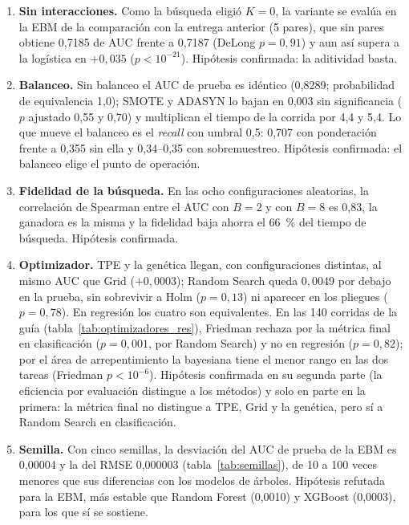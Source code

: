 \begin{enumerate}
  \item \textbf{Sin interacciones.} Como la búsqueda eligió $K = 0$, la variante se evalúa en la EBM de la
        comparación con la entrega anterior (5 pares), que sin pares obtiene 0,7185 de AUC frente a 0,7187
        (DeLong $p = 0{,}91$) y aun así supera a la logística en $+0{,}035$ ($p < 10^{-21}$). Hipótesis
        confirmada: la aditividad basta.
  \item \textbf{Balanceo.} Sin balanceo el AUC de prueba es idéntico (0,8289; probabilidad de equivalencia
        1,0); SMOTE y ADASYN lo bajan en 0,003
        sin significancia ($p$ ajustado 0,55 y 0,70) y multiplican el tiempo de la corrida por 4,4
        y 5,4. Lo que mueve el balanceo es el \emph{recall} con umbral
        0,5: 0,707 con ponderación frente a 0,355 sin ella y 0,34--0,35 con sobremuestreo. Hipótesis
        confirmada: el balanceo elige el punto de operación.
  \item \textbf{Fidelidad de la búsqueda.} En las ocho configuraciones aleatorias, la correlación de Spearman
        entre el AUC con $B = 2$ y con $B = 8$ es 0,83, la ganadora es la misma y la fidelidad
        baja ahorra el 66~\% del tiempo de búsqueda. Hipótesis confirmada.
  \item \textbf{Optimizador.} TPE y la genética llegan, con configuraciones distintas, al mismo AUC que Grid
        ($+0{,}0003$); Random Search queda $0{,}0049$ por debajo en la prueba, sin sobrevivir a Holm
        ($p = 0{,}13$) ni aparecer en los pliegues ($p = 0{,}78$). En regresión los cuatro son equivalentes. En
        las 140 corridas de la guía (tabla~\ref{tab:optimizadores_res}), Friedman rechaza por la métrica final en
        clasificación ($p = 0{,}001$, por Random Search) y no en regresión ($p = 0{,}82$); por el área de
        arrepentimiento la bayesiana tiene el menor rango en las dos tareas (Friedman $p < 10^{-6}$). Hipótesis
        confirmada en su segunda parte (la eficiencia por evaluación distingue a los métodos) y solo en parte en
        la primera: la métrica final no distingue a TPE, Grid y la genética, pero sí a Random Search en
        clasificación.
  \item \textbf{Semilla.} Con cinco semillas, la desviación del AUC de prueba de la EBM es 0,00004 y la del
        RMSE 0,000003 (tabla~\ref{tab:semillas}), de 10 a 100 veces menores que sus diferencias con los modelos
        de árboles. Hipótesis refutada para la EBM, más estable que Random Forest (0,0010) y XGBoost (0,0003),
        para los que sí se sostiene.
\end{enumerate}

